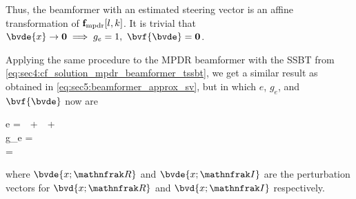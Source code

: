 Thus, the beamformer with an estimated steering vector is an affine transformation of $\bvfb{\mpdr}[l,k]$. It is trivial that $\bvde{x} \to \mathbf{0} \implies g_e = 1,~\bvf{\bvde} = \mathbf{0}$.

Applying the same procedure to the MPDR beamformer with the SSBT from \cref{eq:sec4:cf_solution_mpdr_beamformer_tssbt}, we get a similar result as obtained in \cref{eq:sec5:beamformer_approx_sv}, but in which $e$, $g_e$, and $\bvf{\bvde}$ now are
\begin{subgather}
	e =  \,\bvOm\,  +  \,\bvOm\,  +  \,\bvOm\,  \\
	g_e =  \\
	\bvf{\bvde} = 
\end{subgather}
where $\bvde{x;\re}$ and $\bvde{x;\im}$ are the perturbation vectors for $\bvd{x;\re}$ and $\bvd{x;\im}$ respectively.